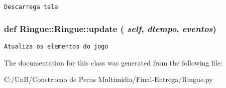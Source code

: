 \begin{footnotesize}\begin{verbatim}Descarrega tela\end{verbatim}
\end{footnotesize}
 \hypertarget{class_ringue_1_1_ringue_7a7f7bcc12547dd5ea87b0b8fa7540ea}{
\subsubsection[{update}]{\setlength{\rightskip}{0pt plus 5cm}def Ringue::Ringue::update ( {\em self}, \/   {\em dtempo}, \/   {\em eventos})}}
\label{class_ringue_1_1_ringue_7a7f7bcc12547dd5ea87b0b8fa7540ea}




\begin{footnotesize}\begin{verbatim}Atualiza os elementos do jogo \end{verbatim}
\end{footnotesize}
 

The documentation for this class was generated from the following file:\begin{CompactItemize}
\item 
C:/UnB/Construcao de Pecas Multimidia/Final-Entrega/Ringue.py\end{CompactItemize}
